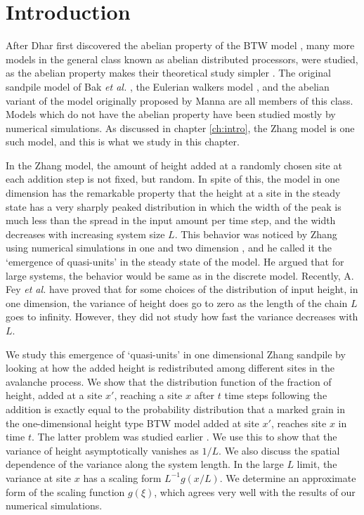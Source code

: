\documentclass[11pt,a4paper]{book}
\begin{document}
\section{Introduction}\label{ch4.1}
After Dhar first discovered the abelian property of the BTW model
\cite{dharprl}, many more models in the general class known as abelian distributed 
processors, were studied, as the abelian 
property makes their theoretical study simpler
\cite{dharphysica06}. The 
original sandpile model of Bak \textit{et al.} \cite{btw}, the Eulerian walkers 
model \cite{euler}, and the abelian variant \cite{sasm} 
of the model originally proposed by Manna \cite{manna} are all members 
of 
this class.  Models which do not have the abelian property have been 
studied mostly by numerical simulations. As discussed in chapter
\ref{ch:intro}, the Zhang model is one such model, and
this is what we study in this chapter.

In the Zhang model, the amount of height added at a randomly chosen site 
at each addition step is not fixed, but random.  In spite of 
this, the model in one dimension has the remarkable property that the 
height at a site in the steady state has a very sharply peaked 
distribution in which the width of the peak is much less than the 
spread in the input amount per time step, and the width decreases with 
increasing system size $L$. This behavior was noticed by Zhang 
using numerical simulations in one and two dimension \cite{zhang}, and he called it 
the `emergence of quasi-units' in the 
steady state of the model. He argued that for large systems, the 
behavior would be same as in the discrete model. Recently, A. Fey 
\textit{et al.} \cite{redig} have proved that for some choices of the distribution of input height, in one dimension, the 
variance of height does go to zero as the length of the chain $L$ goes 
to infinity. However, they did 
not study how fast the variance decreases with $L$.


We study this emergence of `quasi-units' in one 
dimensional Zhang sandpile by looking at how the added height is redistributed 
among different sites in the avalanche process. We show that the 
distribution function of the fraction of height, added at a site $x'$, 
reaching a site $x$
after $t$ time steps following the addition is exactly equal to the 
probability distribution that a marked grain in the 
one-dimensional height type BTW model added at site $x'$, reaches site $x$ in 
time $t$. The latter problem was
studied earlier \cite{punya}. We use this to show that the 
variance of height asymptotically vanishes as $ 1/L$.  We also 
discuss the spatial dependence of the variance along the system length.  In 
the large $L$ limit, the variance at site $x$ has a scaling form 
$L^{-1}g(x/L)$. We determine an approximate form of the scaling 
function $g(\xi)$, which agrees very well with the results of our 
numerical simulations.
\end{document}
